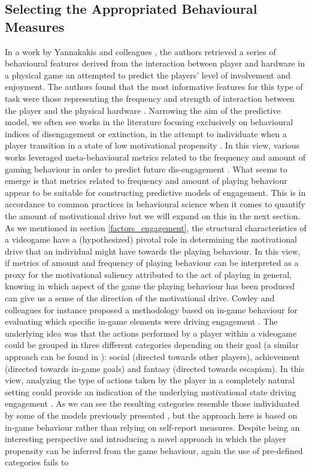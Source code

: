 \subsection{Selecting the Appropriated Behavioural Measures} In a work by Yannakakis and colleagues \cite{yannakakis2007game}, the authors retrieved a series of behavioural features derived from the interaction between player and hardware in a physical game an attempted to predict the players' level of involvement and enjoyment. The authors found that the most informative features for this type of task were those representing the frequency and strength of interaction between the player and the physical hardware \cite{yannakakis2007game}. Narrowing the aim of the predictive model, we often see works in the literature focusing exclusively on behavioural indices of disengagement or extinction, in the attempt to individuate when a player transition in a state of low motivational propensity \cite{el2021game}. In this view, various works leveraged meta-behavioural metrics related to the frequency and amount of gaming behaviour in order to predict future dis-engagement \cite{runge2014churn, kim2017churn, hadiji2014predicting}. What seems to emerge is that metrics related to frequency and amount of playing behaviour appear to be suitable for constructing predictive models of engagement. This is in accordance to common practices in behavioural science when it comes to quantify the amount of motivational drive \cite{cacioppo2007handbook} but we will expand on this in the next section. As we mentioned in section \ref{factors_engagement}, the structural characteristics of a videogame have a (hypothesized) pivotal role in determining the motivational drive that an individual might have towards the playing behaviour. In this view, if metrics of amount and frequency of playing behaviour can be interpreted as a proxy for the motivational saliency attributed to the act of playing in general, knowing in which aspect of the game the playing behaviour has been produced can give us a sense of the direction of the motivational drive. Cowley and colleagues for instance proposed a methodology based on in-game behaviour for evaluating which specific in-game elements were driving engagement \cite{cowley2016behavlets}. The underlying idea was that the actions performed by a player within a videogame could be grouped in three different categories depending on their goal (a similar approach can be found in \cite{bartle1996hearts}): social (directed towards other players), achievement (directed towards in-game goals) and fantasy (directed towards escapism). In this view, analyzing the type of actions taken by the player in a completely natural setting could provide an indication of the underlying motivational state driving engagement \cite{cowley2016behavlets}. As we can see the resulting categories resemble those individuated by some of the models previously presented \cite{yee2006motivations, bartle1996hearts}, but the approach here is based on in-game behaviour rather than relying on self-report measures. Despite being an interesting perspective and introducing a novel approach in which the player propensity can be inferred from the game behaviour, again the use of pre-defined categories fails to 